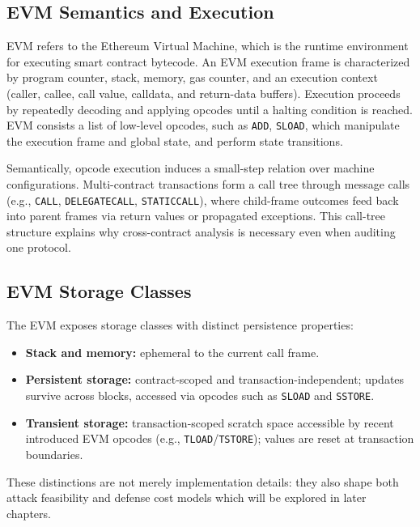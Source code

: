 \subsection{EVM Semantics and Execution}

EVM refers to the Ethereum Virtual Machine, which is the runtime
environment for executing smart contract bytecode.
An EVM execution frame is characterized by program counter,
stack, memory, gas counter, and an execution context
(caller, callee, call value, calldata, and return-data buffers).
Execution proceeds by repeatedly decoding
and applying opcodes until a halting condition is reached.
EVM consists a list of
low-level opcodes, such as \texttt{ADD}, \texttt{SLOAD},
which manipulate the execution frame and global state,
and perform state transitions.

Semantically, opcode execution induces a small-step
relation over machine configurations. Multi-contract
transactions form a call tree through
message calls (e.g., \texttt{CALL},
\texttt{DELEGATECALL}, \texttt{STATICCALL}),
where child-frame outcomes feed back into parent
frames via return values or propagated exceptions.
This call-tree structure explains why cross-contract
analysis is necessary even when auditing one protocol.


\subsection{EVM Storage Classes}
The EVM exposes storage classes with distinct
persistence properties:
\begin{itemize}
    \item \textbf{Stack and memory:}
    ephemeral to the current call frame.
    \item \textbf{Persistent storage:}
    contract-scoped and transaction-independent;
    updates survive across blocks, accessed via
    opcodes such as \texttt{SLOAD} and \texttt{SSTORE}.
    \item \textbf{Transient storage:}
    transaction-scoped scratch space accessible
    by recent introduced EVM opcodes
    (e.g., \texttt{TLOAD}/\texttt{TSTORE});
    values are reset at transaction boundaries.
\end{itemize}
These distinctions are not merely implementation
details: they also shape both attack feasibility
and defense cost models which will be explored in later chapters.


